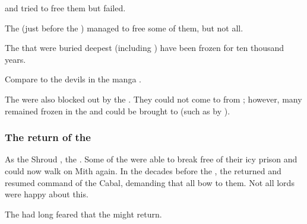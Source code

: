 \Semiza{} and \Thanatzil{} tried to free them but failed. 

The \resphain{} (just before the \Secondbanewar) managed to free some of them, but not all. 

The \banelords{} that were buried deepest (including \Daggerrain) have been frozen for ten thousand years. 

Compare to the devils in the manga \cite{NagaiGo:Devilman}. 

The \lesserbanes{} were also blocked out by the \CrystalSphere. 
They could not come to \Miith{} from \Erebos; however, many \lesserbanes{} remained frozen in the \CrystalSphere{} and could be brought to \Miith{} (such as by ). 






\subsubsection{The return of the \banelords}
\index{\CrystalSphere}%
As the Shroud , the \CrystalSphere{} . 
Some of the \banelords{} were able to break free of their icy prison and could now walk on Mith again. 
In the decades before the , the \banelords{} returned and resumed command of the Cabal, demanding that all \resphain{} bow to them. 
Not all \resphan{} lords were happy about this. 

The \dragons{} had long feared that the \banelords{} might return. 










